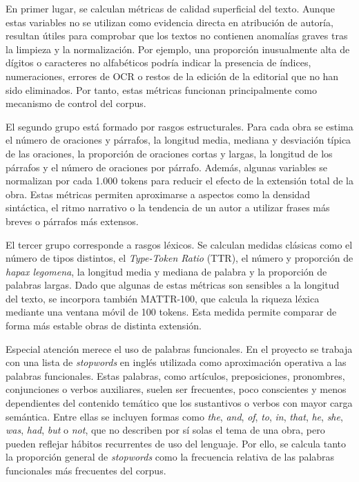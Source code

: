 \documentclass[IB]{TFUOC}%
\begin{document}
En primer lugar, se calculan métricas de calidad superficial del texto. Aunque estas variables no se utilizan como evidencia directa en atribución de autoría, resultan útiles para comprobar que los textos no contienen anomalías graves tras la limpieza y la normalización. Por ejemplo, una proporción inusualmente alta de dígitos o caracteres no alfabéticos podría indicar la presencia de índices, numeraciones, errores de OCR o restos de la edición de la editorial que no han sido eliminados. Por tanto, estas métricas funcionan principalmente como mecanismo de control del corpus.

El segundo grupo está formado por rasgos estructurales. Para cada obra se estima el número de oraciones y párrafos, la longitud media, mediana y desviación típica de las oraciones, la proporción de oraciones cortas y largas, la longitud de los párrafos y el número de oraciones por párrafo. Además, algunas variables se normalizan por cada 1.000 tokens para reducir el efecto de la extensión total de la obra. Estas métricas permiten aproximarse a aspectos como la densidad sintáctica, el ritmo narrativo o la tendencia de un autor a utilizar frases más breves o párrafos más extensos.

El tercer grupo corresponde a rasgos léxicos. Se calculan medidas clásicas como el número de tipos distintos, el \textit{Type-Token Ratio} (TTR), el número y proporción de \textit{hapax legomena}, la longitud media y mediana de palabra y la proporción de palabras largas. Dado que algunas de estas métricas son sensibles a la longitud del texto, se incorpora también MATTR-100, que calcula la riqueza léxica mediante una ventana móvil de 100 tokens. Esta medida permite comparar de forma más estable obras de distinta extensión.

Especial atención merece el uso de palabras funcionales. En el proyecto se trabaja con una lista de \textit{stopwords} en inglés utilizada como aproximación operativa a las palabras funcionales. Estas palabras, como artículos, preposiciones, pronombres, conjunciones o verbos auxiliares, suelen ser frecuentes, poco conscientes y menos dependientes del contenido temático que los sustantivos o verbos con mayor carga semántica. Entre ellas se incluyen formas como \textit{the}, \textit{and}, \textit{of}, \textit{to}, \textit{in}, \textit{that}, \textit{he}, \textit{she}, \textit{was}, \textit{had}, \textit{but} o \textit{not}, que no describen por sí solas el tema de una obra, pero pueden reflejar hábitos recurrentes de uso del lenguaje. Por ello, se calcula tanto la proporción general de \textit{stopwords} como la frecuencia relativa de las palabras funcionales más frecuentes del corpus.
\end{document}
